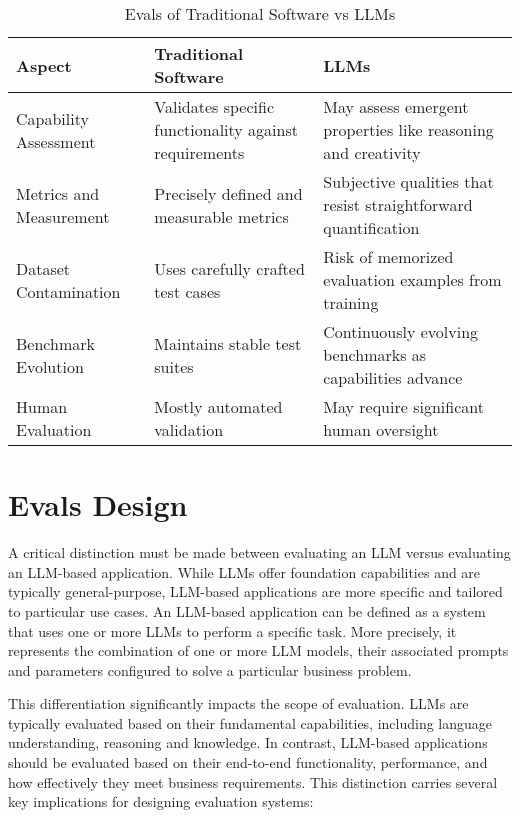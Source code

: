 \begin{table}[h]
\caption{Evals of Traditional Software vs LLMs}
\label{evals-table}
\begin{tabular}{p{}p{}p{}}
\hline
\textbf{Aspect} & \textbf{Traditional Software} & \textbf{LLMs} \\
\hline
Capability Assessment & Validates specific functionality against requirements & May assess emergent properties like reasoning and creativity \\
\hline
Metrics and Measurement & Precisely defined and measurable metrics & Subjective qualities that resist straightforward quantification \\
\hline
Dataset Contamination & Uses carefully crafted test cases & Risk of memorized evaluation examples from training \\
\hline
Benchmark Evolution & Maintains stable test suites & Continuously evolving benchmarks as capabilities advance \\
\hline
Human Evaluation & Mostly automated validation & May require significant human oversight \\
\hline
\end{tabular}
\end{table}

\section{Evals Design}

A critical distinction must be made between evaluating an LLM versus evaluating an LLM-based application. While LLMs offer foundation capabilities and are typically general-purpose, LLM-based applications are more specific and tailored to particular use cases. An LLM-based application can be defined as a system that uses one or more LLMs to perform a specific task. More precisely, it represents the combination of one or more LLM models, their associated prompts and parameters configured to solve a particular business problem.

This differentiation significantly impacts the scope of evaluation. LLMs are typically evaluated based on their fundamental capabilities, including language understanding, reasoning and knowledge. In contrast, LLM-based applications should be evaluated based on their end-to-end functionality, performance, and how effectively they meet business requirements. This distinction carries several key implications for designing evaluation systems:

